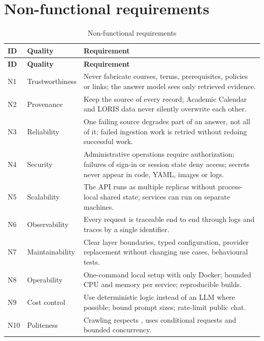 \documentclass[11pt,letterpaper]{report}
\begin{document}
\section{Non-functional requirements}
\begin{longtable}{@{}P{1.1cm}P{3.0cm}P{11.2cm}@{}}
\caption{Non-functional requirements}\label{tab:nfr}\\
\toprule
\textbf{ID} & \textbf{Quality} & \textbf{Requirement} \\
\midrule
\endfirsthead
\toprule
\textbf{ID} & \textbf{Quality} & \textbf{Requirement} \\
\midrule
\endhead
N1 & Trustworthiness & Never fabricate courses, terms, prerequisites, policies or links; the answer model sees only retrieved evidence. \\
N2 & Provenance & Keep the source of every record; Academic Calendar and LORIS data never silently overwrite each other. \\
N3 & Reliability & One failing source degrades part of an answer, not all of it; failed ingestion work is retried without redoing successful work. \\
N4 & Security & Administrative operations require authorization; failures of sign-in or session state deny access; secrets never appear in code, YAML, images or logs. \\
N5 & Scalability & The API runs as multiple replicas without process-local shared state; services can run on separate machines. \\
N6 & Observability & Every request is traceable end to end through logs and traces by a single identifier. \\
N7 & Maintainability & Clear layer boundaries, typed configuration, provider replacement without changing use cases, behavioural tests. \\
N8 & Operability & One-command local setup with only Docker; bounded CPU and memory per service; reproducible builds. \\
N9 & Cost control & Use deterministic logic instead of an LLM where possible; bound prompt sizes; rate-limit public chat. \\
N10 & Politeness & Crawling respects , uses conditional requests and bounded concurrency. \\
\bottomrule
\end{longtable}
\end{document}
